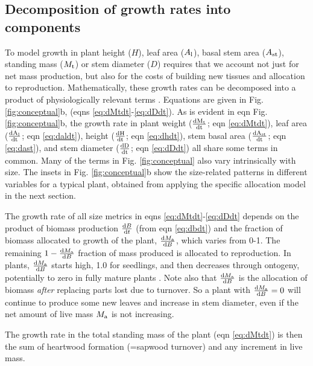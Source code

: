 \documentclass[9pt,twocolumn,twoside]{pnas-new}
\newcommand{\ud}{\ensuremath{\rm{d}}}
\begin{document}
\subsection{Decomposition of growth rates into components}

\setcounter{equation}{9}

To model growth in plant height ($H$), leaf area ($A_{\rm l}$), basal stem area ($ A_{\rm st}$), standing mass ($M_{\rm t}$) or stem diameter ($D$) requires that we account not just for net mass production, but also for the costs of building new tissues and allocation to reproduction. Mathematically, these growth rates can be decomposed into a product of physiologically relevant terms \citep{Falster-2011, Gibert-2016}. Equations are given in Fig. \ref{fig:conceptual}b, (eqns \ref{eq:dMtdt}-\ref{eq:dDdt}). As is evident in eqn  Fig. \ref{fig:conceptual}b, the growth rate in plant weight ($\frac{\ud M_{\rm t} }{\ud t}$; eqn \ref{eq:dMtdt}), leaf area ($\frac{\ud A_{\rm l}}{\ud t}$; eqn \ref{eq:daldt}), height ($\frac{\ud H}{\ud t}$; eqn \ref{eq:dhdt}), stem basal area ($\frac{\ud  A_{\rm st}}{\ud t}$; eqn \ref{eq:dast}), and stem diameter ($\frac{\ud D}{\ud t}$; eqn \ref{eq:dDdt}) all share some terms in common. Many of the terms in Fig. \ref{fig:conceptual} also vary intrinsically with size. The insets in Fig. \ref{fig:conceptual}b show the size-related patterns in different variables for a typical plant, obtained from applying the specific allocation model in the next section.

The growth rate of all size metrics in eqns \ref{eq:dMtdt}-\ref{eq:dDdt} depends on the product of biomass production $\frac{{\rm d}B} {{\rm d}t}$ (from eqn \ref{eq:dbdt}) and the fraction of biomass allocated to growth of the plant, $\frac{{\rm d}M_{\rm a}}{{\rm d}B}$, which varies from 0-1. The remaining  $1- \frac{{\rm d}M_{\rm a}}{{\rm d}B}$ fraction of mass produced is allocated to reproduction. In plants, $\frac{{\rm d}M_{\rm a}}{{\rm d}B}$ starts high, 1.0 for seedlings, and then decreases through ontogeny, potentially to zero in fully mature plants \citep{Wenk-2015}. Note also that $\frac{{\rm d}M_{\rm a}}{{\rm d}B}$ is the allocation of biomass \emph{after} replacing parts lost due to turnover. So a plant with $\frac{{\rm d}M_{\rm a}}{{\rm d}B}=0$ will continue to produce some new leaves and increase in stem diameter, even if the net amount of live mass $M_{\rm a}$ is not increasing.

The growth rate in the total standing mass of the plant (eqn \ref{eq:dMtdt}) is then the sum of heartwood formation (=sapwood turnover) and any increment in live mass.
\end{document}
